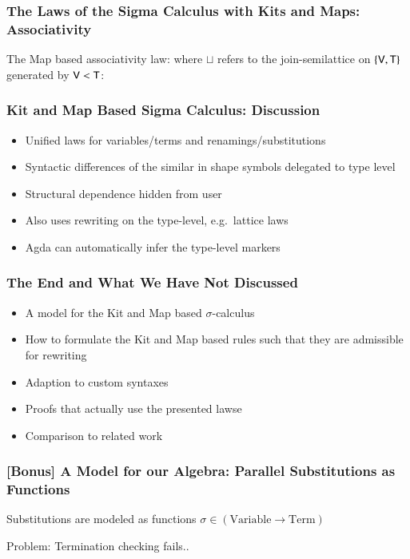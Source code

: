 \documentclass[dvipsnames,aspectratio=169,pdftex]{beamer}
\begin{document}
\begin{frame}[fragile]
  \frametitle{The Laws of the Sigma Calculus with Kits and Maps: Associativity}
  The Map based associativity law:
  \EEAssoc{}
  where $\sqcup$ refers to the join-semilattice on $\{\AgdaFunction{V},
    \AgdaFunction{T}\}$ generated by $\AgdaFunction{V} <  \AgdaFunction{T}$:
  \ETypeLevel{}
\end{frame}

\begin{frame}[fragile]
  \frametitle{Kit and Map Based Sigma Calculus: Discussion}
  \begin{itemize}
    \item Unified laws for variables/terms and renamings/substitutions
    \item Syntactic differences of the similar in shape symbols delegated to type level
    \item Structural dependence hidden from user
    \item Also uses rewriting on the type-level, e.g.\ lattice laws
    \item Agda can automatically infer the type-level markers
  \end{itemize}
\end{frame}

\begin{frame}[fragile]
  \frametitle{The End and What We Have Not Discussed}
  \begin{itemize}
    \item A model for the Kit and Map based $\sigma$-calculus
    \item How to formulate the Kit and Map based rules such that they are admissible for
          rewriting
    \item Adaption to custom syntaxes
    \item Proofs that actually use the presented lawse
    
    \item Comparison to related work
  \end{itemize}
\end{frame}

\begin{frame}[fragile]
  \frametitle{[Bonus] A Model for our Algebra: Parallel Substitutions as Functions}
  Substitutions are modeled as functions $\sigma \in (\text{Variable} \to \text{Term})$
  \noindent\begin{minipage}[t]{0.48\linewidth}
    \raggedright{}
    \EXLookUp{}
    \EXId{}
    \EXWk{}
    \EXExt{}
  \end{minipage}
  \hfill
  \begin{minipage}[t]{0.48\linewidth}
    \raggedright{}
    \ESRFail{}
    Problem: Termination checking fails..
  \end{minipage}
\end{frame}
\end{document}
